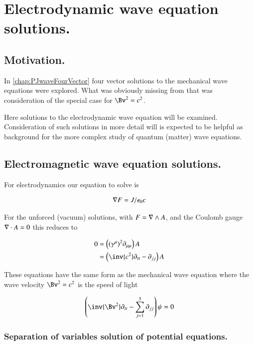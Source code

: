 \chapter{Electrodynamic wave equation solutions.}\label{chap:PJemWave}
\date{ Jan 25, 2009.  $RCSfile: emWave.tex,v $ Last $Revision: 1.12 $ $Date: 2009/06/11 16:45:58 $ }

\section{Motivation. }

In \ref{chap:PJwaveFourVector} four vector solutions to the mechanical wave
equations were explored.  What was obviously missing from that 
was consideration of the special case for $\Bv^2 = c^2$.

Here solutions to the electrodynamic wave equation will be examined.
Consideration of such solutions in more detail will is expected
to be helpful 
as background for the more complex study of quantum (matter) wave equations.

\section{Electromagnetic wave equation solutions. }

For electrodynamics our equation to solve is

\begin{align}
\nabla F = J/\epsilon_0 c
\end{align}

For the unforced (vacuum) solutions, with 
$F = \nabla \wedge A$, and the Coulomb gauge $\nabla \cdot A = 0$ this 
reduces to

\begin{align*}
0 
&= \left((\gamma^\mu)^2 \partial_{\mu\mu}\right) A  \\
&= \left( \inv{c^2}\partial_{tt} -\partial_{jj} \right) A
\end{align*}

These equations have the same form as the mechanical wave equation
where the wave velocity $\Bv^2 = c^2$ is the speed of light

\begin{align}\label{eqn:em_wave:waveEquation}
\left( \inv{\Bv^2} \partial_{tt} - \sum_{j=1}^3 \partial_{jj}\right) \psi = 0
\end{align}

\subsection{Separation of variables solution of potential equations. }

